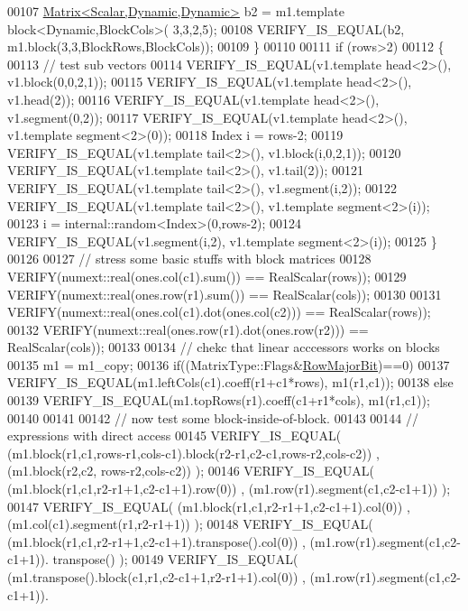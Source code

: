 \begin{DoxyCode}
00107     \hyperlink{group___core___module}{Matrix<Scalar,Dynamic,Dynamic>} b2 = m1.template block<Dynamic,BlockCols>(
      3,3,2,5);
00108     VERIFY\_IS\_EQUAL(b2, m1.block(3,3,BlockRows,BlockCols));
00109   \}
00110 
00111   \textcolor{keywordflow}{if} (rows>2)
00112   \{
00113     \textcolor{comment}{// test sub vectors}
00114     VERIFY\_IS\_EQUAL(v1.template head<2>(), v1.block(0,0,2,1));
00115     VERIFY\_IS\_EQUAL(v1.template head<2>(), v1.head(2));
00116     VERIFY\_IS\_EQUAL(v1.template head<2>(), v1.segment(0,2));
00117     VERIFY\_IS\_EQUAL(v1.template head<2>(), v1.template segment<2>(0));
00118     Index i = rows-2;
00119     VERIFY\_IS\_EQUAL(v1.template tail<2>(), v1.block(i,0,2,1));
00120     VERIFY\_IS\_EQUAL(v1.template tail<2>(), v1.tail(2));
00121     VERIFY\_IS\_EQUAL(v1.template tail<2>(), v1.segment(i,2));
00122     VERIFY\_IS\_EQUAL(v1.template tail<2>(), v1.template segment<2>(i));
00123     i = internal::random<Index>(0,rows-2);
00124     VERIFY\_IS\_EQUAL(v1.segment(i,2), v1.template segment<2>(i));
00125   \}
00126 
00127   \textcolor{comment}{// stress some basic stuffs with block matrices}
00128   VERIFY(numext::real(ones.col(c1).sum()) == RealScalar(rows));
00129   VERIFY(numext::real(ones.row(r1).sum()) == RealScalar(cols));
00130 
00131   VERIFY(numext::real(ones.col(c1).dot(ones.col(c2))) == RealScalar(rows));
00132   VERIFY(numext::real(ones.row(r1).dot(ones.row(r2))) == RealScalar(cols));
00133   
00134   \textcolor{comment}{// chekc that linear acccessors works on blocks}
00135   m1 = m1\_copy;
00136   \textcolor{keywordflow}{if}((MatrixType::Flags&\hyperlink{group__flags_gae4f56c2a60bbe4bd2e44c5b19cbe8762}{RowMajorBit})==0)
00137     VERIFY\_IS\_EQUAL(m1.leftCols(c1).coeff(r1+c1*rows), m1(r1,c1));
00138   \textcolor{keywordflow}{else}
00139     VERIFY\_IS\_EQUAL(m1.topRows(r1).coeff(c1+r1*cols), m1(r1,c1));
00140   
00141 
00142   \textcolor{comment}{// now test some block-inside-of-block.}
00143   
00144   \textcolor{comment}{// expressions with direct access}
00145   VERIFY\_IS\_EQUAL( (m1.block(r1,c1,rows-r1,cols-c1).block(r2-r1,c2-c1,rows-r2,cols-c2)) , (m1.block(r2,c2,
      rows-r2,cols-c2)) );
00146   VERIFY\_IS\_EQUAL( (m1.block(r1,c1,r2-r1+1,c2-c1+1).row(0)) , (m1.row(r1).segment(c1,c2-c1+1)) );
00147   VERIFY\_IS\_EQUAL( (m1.block(r1,c1,r2-r1+1,c2-c1+1).col(0)) , (m1.col(c1).segment(r1,r2-r1+1)) );
00148   VERIFY\_IS\_EQUAL( (m1.block(r1,c1,r2-r1+1,c2-c1+1).transpose().col(0)) , (m1.row(r1).segment(c1,c2-c1+1)).
      transpose() );
00149   VERIFY\_IS\_EQUAL( (m1.transpose().block(c1,r1,c2-c1+1,r2-r1+1).col(0)) , (m1.row(r1).segment(c1,c2-c1+1)).

\end{DoxyCode}
